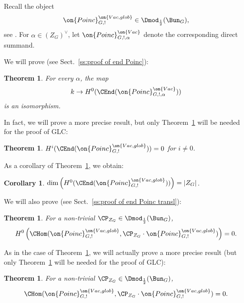 \documentclass[9pt]{amsart}
\newtheorem{cor}[subsubsection]{Corollary}
\newtheorem{thm}[subsubsection]{Theorem}
\theoremstyle{remark}
\theoremstyle{definition}
\theoremstyle{remark}
\newcommand{\thmref}[1]{Theorem~\ref{#1}}
\newcommand{\secref}[1]{Sect.~\ref{#1}}
\numberwithin{equation}{section}
\begin{document}
\sssec{}

Recall the object
$$\on{Poinc}^{\on{Vac,glob}}_{G,!}\in \Dmod_{\frac{1}{2}}(\Bun_G),$$
see \cite[Sect. 9.6.4]{GLC2}. 
For $\alpha\in (Z_G)^\vee$, let $\on{Poinc}^{\on{Vac}}_{G,!,\alpha}$ denote the corresponding direct summand. 

\sssec{}

We will prove (see \secref{ss:proof of end Poinc}):

\begin{thm} \label{t:end Poinc vac a}
For every $\alpha$, the map
$$k\to H^0(\CEnd(\on{Poinc}^{\on{Vac}}_{G,!,\alpha}))$$ 
is an isomorphism.
\end{thm}

In fact, we will prove a more precise result, but only \thmref{t:end Poinc vac a} will be needed for the proof
of GLC:

\begin{thm} \label{t:end Poinc vac a'}
$H^i(\CEnd(\on{Poinc}^{\on{Vac,glob}}_{G,!}))=0$ for $i\neq 0$.  
\end{thm}

As a corollary of \thmref{t:end Poinc vac a}, we obtain:

\begin{cor} \label{c:end Poinc vac a} 
$\dim\left(H^0(\CEnd(\on{Poinc}^{\on{Vac,glob}}_{G,!}))\right)=|Z_G|$.
\end{cor}

\sssec{}

We will also prove (see \secref{ss:proof of end Poinc transl}):

\begin{thm} \label{t:end Poinc vac b}
For a non-trivial $\CP_{Z_G}\in \Dmod_{\frac{1}{2}}(\Bun_G)$,
$$H^0\left(\CHom(\on{Poinc}^{\on{Vac,glob}}_{G,!},\CP_{Z_G}\cdot \on{Poinc}^{\on{Vac,glob}}_{G,!})\right)=0.$$
\end{thm} 

As in the case of \thmref{t:end Poinc vac a}, we will actually prove a more precise result
(but only \thmref{t:end Poinc vac b} will be needed for the proof of GLC):

\begin{thm} \label{t:end Poinc vac b'}
For a non-trivial $\CP_{Z_G}\in \Dmod_{\frac{1}{2}}(\Bun_G)$,
$$\CHom(\on{Poinc}^{\on{Vac,glob}}_{G,!},\CP_{Z_G}\cdot \on{Poinc}^{\on{Vac,glob}}_{G,!})=0.$$
\end{thm} 

\end{document}
